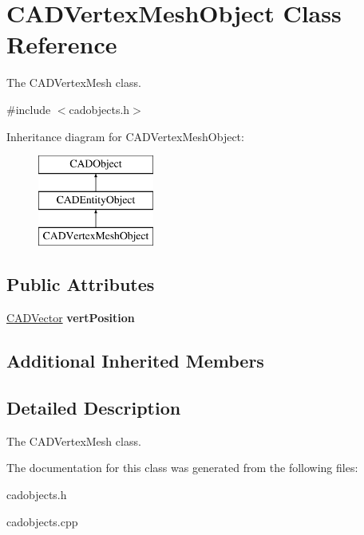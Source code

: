 \hypertarget{class_c_a_d_vertex_mesh_object}{}\section{C\+A\+D\+Vertex\+Mesh\+Object Class Reference}
\label{class_c_a_d_vertex_mesh_object}


The C\+A\+D\+Vertex\+Mesh class.  




{\ttfamily \#include $<$cadobjects.\+h$>$}

Inheritance diagram for C\+A\+D\+Vertex\+Mesh\+Object\+:\begin{figure}[H]
\begin{center}
\leavevmode
\includegraphics[height=3.000000cm]{class_c_a_d_vertex_mesh_object}
\end{center}
\end{figure}
\subsection*{Public Attributes}
\begin{DoxyCompactItemize}
\item 
\hyperlink{class_c_a_d_vector}{C\+A\+D\+Vector} {\bfseries vert\+Position}\hypertarget{class_c_a_d_vertex_mesh_object_a9c75703eb40385cf09edfa947d02931a}{}\label{class_c_a_d_vertex_mesh_object_a9c75703eb40385cf09edfa947d02931a}

\end{DoxyCompactItemize}
\subsection*{Additional Inherited Members}


\subsection{Detailed Description}
The C\+A\+D\+Vertex\+Mesh class. 

The documentation for this class was generated from the following files\+:\begin{DoxyCompactItemize}
\item 
cadobjects.\+h\item 
cadobjects.\+cpp\end{DoxyCompactItemize}
